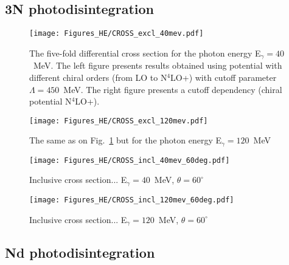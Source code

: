 \subsection{3N photodisintegration}
    \begin{figure}[h]
        \begin{center}
            \texttt{[image: Figures\_HE/CROSS\_excl\_40mev.pdf]}
            \end{center}
            \caption{The five-fold differential cross section for the photon 
            energy E$_\gamma=40$~MeV.
            The left figure presents results obtained using potential
            with different chiral orders (from LO to N$^4$LO+) with cutoff parameter $\Lambda=450$~MeV.
            The right figure presents a cutoff dependency (chiral potential N$^4$LO+).}
            \label{CROSS_HE_EXCL_40}
        \end{figure}

        \begin{figure}[h]
            \begin{center}
            \texttt{[image: Figures\_HE/CROSS\_excl\_120mev.pdf]}
            \end{center}
            \caption{The same as on Fig.~\ref{CROSS_HE_EXCL_40} but 
            for the photon energy E$_\gamma=120$~MeV}
            \label{CROSS_HE_EXCL_120}
        \end{figure}

        \begin{figure}[h]
            \begin{center}
            \texttt{[image: Figures\_HE/CROSS\_incl\_40mev\_60deg.pdf]}
            \end{center}
            \caption{Inclusive cross section... E$_\gamma=40$~MeV, $\theta=60^\circ$ }
            \label{CROSS_HE_INCL_40_60deg}
        \end{figure}

        \begin{figure}[h]
            \begin{center}
            \texttt{[image: Figures\_HE/CROSS\_incl\_120mev\_60deg.pdf]}
            \end{center}
            \caption{Inclusive cross section...  E$_\gamma=120$~MeV, $\theta=60^\circ$}
            \label{CROSS_HE_INCL_120_60deg}
        \end{figure}

\subsection{Nd photodisintegration}

